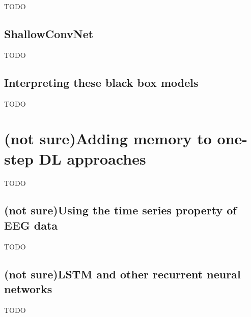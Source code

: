TODO


\subsection{ShallowConvNet}
\label{subsec:offline_bci_system_one_step_dl_shallowconvnet}

TODO


\subsection{Interpreting these black box models}
\label{subsec:offline_bci_system_one_step_dl_interpreting}

TODO

\section{(not sure)Adding memory to one-step DL approaches}
\label{sec:offline_bci_system_rnn}

TODO


\subsection{(not sure)Using the time series property of EEG data}
\label{subsec:offline_bci_system_rnn_why_rnn}

TODO


\subsection{(not sure)LSTM and other recurrent neural networks}
\label{subsec:offline_bci_system_rnn_lstm_explained}

TODO

